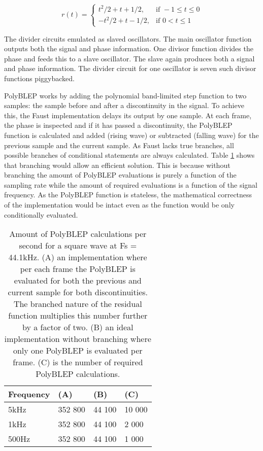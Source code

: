 \documentclass[11pt,a4paper]{article}
\begin{document}
\begin{equation}
\label{polyblep:chosen}
r(t) = \begin{cases} 	t^2/2  + t + 1/2, & \mbox{if } -1 \leq t \leq 0\\ 
			-t^2/2 + t - 1/2, & \mbox{if } 0 < t \leq 1 \end{cases}
\end{equation}

The divider circuits emulated as slaved oscillators. The main oscillator function outputs both the signal and phase information. One divisor function divides the phase and feeds this to a slave oscillator. The slave again produces both a signal and phase information. The divider circuit for one oscillator is seven such divisor functions piggybacked.

PolyBLEP works by adding the polynomial band-limited step function to two samples: the sample before and after a discontinuity in the signal. To achieve this, the Faust implementation delays its output by one sample. At each frame, the phase is inspected and if it has passed a discontinuity, the PolyBLEP function is calculated and added (rising wave) or subtracted (falling wave) for the previous sample and the current sample. As Faust lacks true branches, all possible branches of conditional statements are always calculated. Table \ref{table:polyblep-amount} shows that branching would allow an efficient solution. This is because without branching the amount of PolyBLEP evaluations is purely a function of the sampling rate while the amount of required evaluations is a function of the signal frequency. As the PolyBLEP function is stateless, the mathematical correctness of the implementation would be intact even as the function would be only conditionally evaluated.

\begin{table}[h]
 \begin{center}
\begin{tabular}{|l|l|l|l|}

      \hline
      Frequency & (A)        &  (B)         & (C) \\
      \hline\hline
      5kHz     & 352 800     & 44 100       & 10 000\\
      1kHz     & 352 800     & 44 100       &  2 000\\
      500Hz    & 352 800     & 44 100       &  1 000\\
      \hline

\end{tabular}
\caption{Amount of PolyBLEP calculations per second for a square wave at Fs = 44.1kHz. 
(A) an implementation where per each frame the PolyBLEP is evaluated for both the previous and current sample for both discontinuities. The branched nature of the residual function multiplies this number further by a factor of two.
(B) an ideal implementation without branching where only one PolyBLEP is evaluated per frame.
(C) is the number of required PolyBLEP calculations.  }\label{table:polyblep-amount}
 \end{center}
\end{table}
\end{document}
